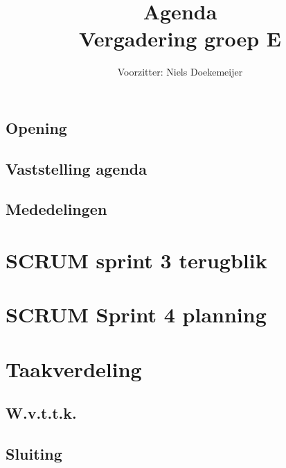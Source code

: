 \documentclass[a4paper]{article}
\title{Agenda \\ Vergadering groep E}
\author{Voorzitter: Niels Doekemeijer}
\begin{document}
\maketitle
\subsection*{Opening}
\subsection*{Vaststelling agenda}
\subsection*{Mededelingen}
\section{SCRUM sprint 3 terugblik}
\section{SCRUM Sprint 4 planning}
\section{Taakverdeling}
\subsection*{W.v.t.t.k.}
\subsection*{Sluiting}
\end{document}
